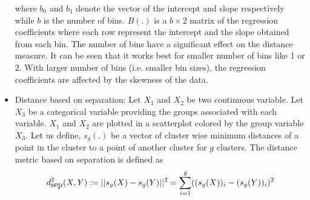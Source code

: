 \documentclass[12]{article}
\begin{document}
\begin{itemize}
where $b_0$ and $b_1$ denote the vector of the intercept and slope respectively while $b$ is the number of bins. $B(.)$ is a $b \times 2$ matrix of the regression coefficients where each row represent the  intercept and the slope obtained from each bin. The number of bins have a significant effect on the distance measure. It can be seen that it works best for smaller number of bins like 1 or 2. With larger number of bins (i.e. smaller bin sizes), the regression coefficients are affected by the skewness of the data.

\item Distance based on separation: Let $X_1$ and $X_2$ be two continuous variable. Let $X_3$ be a categorical variable providing the groups associated with each variable. $X_1$ and $X_2$ are plotted in a scatterplot colored by the group variable $X_3$. Let us define, $s_{g}(.)$ be a vector of cluster wise minimum distances of a point in the cluster to a point of another cluster for $g$ clusters. The distance metric based on separation is defined as
\[
d^2_{\hbox{sep}}(X, Y):= ||s_g(X) - s_g(Y)||^2 = \sum_{i = 1}^g ((s_g(X))_i - (s_g(Y))_i)^2
\]

\end{itemize}
\end{document}
